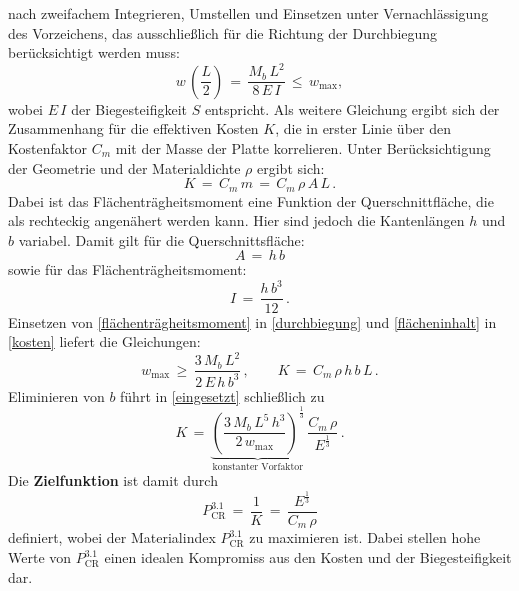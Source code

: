 nach zweifachem Integrieren, Umstellen und Einsetzen unter Vernachlässigung des Vorzeichens, das ausschließlich für die Richtung der Durchbiegung berücksichtigt werden muss:
\begin{equation} \label{durchbiegung}
	w\,\left(\frac{L}{2}\right)\,=\,\frac{M_b \,L^2}{8\,E\,I}\,\le\,w_{\text{max}},
\end{equation}
wobei $E\,I$ der Biegesteifigkeit $S$ entspricht. Als weitere Gleichung ergibt sich der Zusammenhang für die effektiven Kosten $K$, die in erster Linie über den Kostenfaktor $C_m$ mit der Masse der Platte korrelieren. Unter Berücksichtigung der Geometrie und der Materialdichte $\rho$ ergibt sich:
\begin{equation} \label{kosten}
	K\,=\,C_m\,m\,=\,C_m\,\rho\,A\,L\,.
\end{equation}
Dabei ist das Flächenträgheitsmoment eine Funktion der Querschnittfläche, die als rechteckig angenähert werden kann. Hier sind jedoch die Kantenlängen $h$ und $b$ variabel. Damit gilt für die Querschnittsfläche:
\begin{equation} \label{flächeninhalt}
A\,=\,h\,b
\end{equation}
sowie für das Flächenträgheitsmoment:
\begin{equation} \label{flächenträgheitsmoment}
I\,=\,\frac{h\,b^3}{12}\,.
\end{equation}
Einsetzen von \ref{flächenträgheitsmoment} in \ref{durchbiegung} und \ref{flächeninhalt} in \ref{kosten} liefert die Gleichungen:
\begin{equation} \label{eingesetzt}
	w_{\text{max}}\,\ge\,\frac{3\,M_b \,L^2}{2\,E\,h\,b^3}\,, \qquad
	K\,=\,C_m\,\rho\,h\,b\,L\,.
\end{equation}
Eliminieren von $b$ führt in \ref{eingesetzt} schließlich zu
\begin{equation}\label{performance}
K\,=\,\underbrace{\left(\frac{3\,M_b\,L^5\,h^3}{2\,w_{\text{max}}}\right)^{\frac{1}{3}}}_{\text{konstanter Vorfaktor}}\,\frac{C_m\,\rho}{E^{\frac{1}{3}}}\,.
\end{equation}
Die \textbf{Zielfunktion} ist damit durch
\begin{equation} \label{performance31}
P_{\text{CR}}^{3.1}\,=\,\frac{1}{K}\,=\,\frac{E^\frac{1}{3}}{C_m\,\rho}
\end{equation}
definiert, wobei der Materialindex $P_{\text{CR}}^{3.1}$ zu maximieren ist. Dabei stellen hohe Werte von $P_{\text{CR}}^{3.1}$ einen idealen Kompromiss aus den Kosten und der Biegesteifigkeit dar.\\
